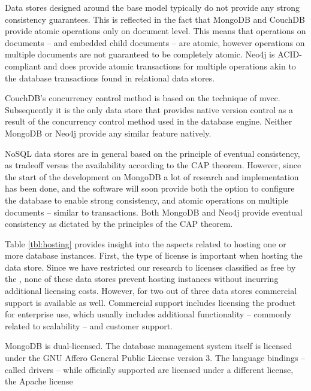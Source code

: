 Data stores designed around the \gls{base} model typically do not provide any strong consistency guarantees.
This is reflected in the fact that MongoDB and CouchDB provide atomic operations only on document level.
This means that operations on documents -- and embedded child documents -- are atomic, however operations on multiple documents are not guaranteed to be completely atomic.
Neo4j is ACID-compliant and does provide atomic transactions for multiple operations akin to the database transactions found in relational data stores.

CouchDB's concurrency control method is based on the technique of \gls{mvcc}.
Subsequently it is the only data store that provides native version control as a result of the concurrency control method used in the database engine.
Neither MongoDB or Neo4j provide any similar feature natively.

NoSQL data stores are in general based on the principle of eventual consistency, as tradeoff versus the availability according to the CAP theorem.
However, since the start of the development on MongoDB a lot of research and implementation has been done, and the software will soon provide both the option to configure the database to enable strong consistency, and atomic operations on multiple documents -- similar to transactions.
Both MongoDB and Neo4j provide eventual consistency as dictated by the principles of the CAP theorem.

\begin{landscape}
  
\end{landscape}

\begin{landscape}
  
\end{landscape}

Table \ref{tbl:hosting} provides insight into the aspects related to hosting one or more database instances.
First, the type of license is important when hosting the data store.
Since we have restricted our research to licenses classified as free by the \textcite{FreeSoftwareFoundation1985}, none of these data stores prevent hosting instances without incurring additional licensing costs.
However, for two out of three data stores commercial support is available as well.
Commercial support includes licensing the product for enterprise use, which usually includes additional functionality -- commonly related to scalability -- and customer support.

MongoDB is dual-licensed.
The database management system itself is licensed under the GNU Affero General Public License version 3.
The language bindings -- called drivers -- while officially supported are licensed under a different license, the Apache license

